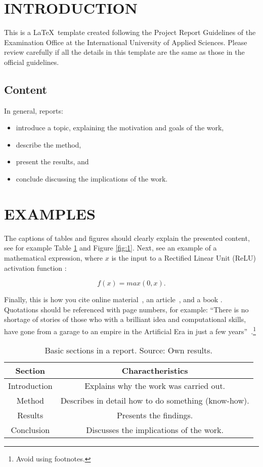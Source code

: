 \documentclass[11pt,a4paper]{article}
\begin{document}
\section{INTRODUCTION}
This is a \LaTeX\  template created following the Project Report Guidelines of the Examination Office at the International University of Applied Sciences. Please review carefully if all the details in this template are the same as those in the official guidelines. 

\subsection{Content}
In general, reports:

\begin{itemize}
\item introduce a topic, explaining the motivation and goals of the work, 
\item describe the method, 
\item  present the results, and
\item conclude discussing the implications of the work.
\end{itemize}

\section{EXAMPLES}
The captions of tables and figures should clearly explain the presented content, see for example Table \ref{table:1} and Figure \ref{fig:1}. Next, see an example of a mathematical expression, where $x$ is the input to a Rectified Linear Unit (ReLU) activation function :

\begin{equation} \label{e:1}
f(x)=max(0,x). 
\end{equation}

Finally, this is how you cite online material~, an article~, and a book . Quotations should be referenced with page numbers, for example: ``There is no shortage of stories of those who with a brilliant idea and computational skills, have gone from a garage to an empire in the Artificial Era in just a few years''~.\footnote{Avoid using footnotes.} 

\begin{table}[h!]
\centering
\begin{tabular}{|c c|} 
 \hline
Section &  Charactheristics \\  \hline
Introduction &  Explains why the work was carried out. \\ 
Method   & Describes in detail how to do something (know-how).\\ 
Results  & Presents the findings.\\
Conclusion  & Discusses the implications of the work.\\

 \hline
\end{tabular}
\caption{Basic sections in a report. Source: Own results.}
\label{table:1}
\end{table}
\end{document}
